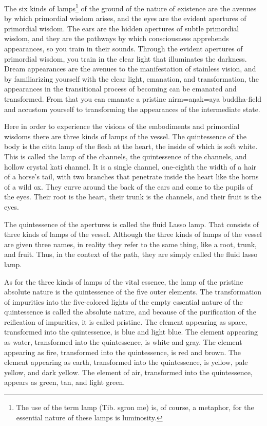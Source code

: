 \documentclass[11pt,twocolumn]{article}
\begin{document}
The six kinds of lamps\footnote{The use of the term lamp (Tib. sgron
  me) is, of course, a metaphor, for the essential nature of these
  lamps is luminosity.} of the ground of the nature of existence are
the avenues by which primordial wisdom arises, and the eyes are the
evident apertures of primordial wisdom. The ears are the hidden
apertures of subtle primordial wisdom, and they are the pathways by
which consciousness apprehends appearances, so you train in their
sounds. Through the evident apertures of primordial wisdom, you train
in the clear light that illuminates the darkness. Dream appearances
are the avenues to the manifestation of stainless vision, and by
familiarizing yourself with the clear light, emanation, and
transformation, the appearances in the transitional process of
becoming can be emanated and transformed. From that you can emanate a
pristine nirm\a={a}\d{n}ak\a={a}ya buddha\hyp{}field and accustom
yourself to transforming the appearances of the intermediate state.

Here in order to experience the visions of the embodiments and
primordial wisdoms there are three kinds of lamps of the vessel. The
quintessence of the body is the citta lamp of the flesh at the heart,
the inside of which is soft white. This is called the lamp of the
channels, the quintessence of the channels, and hollow crystal kati
channel. It is a single channel, one\hyp{}eighth the width of a hair
of a horse's tail, with two branches that penetrate inside the heart
like the horns of a wild ox. They curve around the back of the ears
and come to the pupils of the eyes. Their root is the heart, their
trunk is the channels, and their fruit is the eyes.

The quintessence of the apertures is called the fluid Lasso lamp. That
consists of three kinds of lamps of the vessel. Although the three
kinds of lamps of the vessel are given three names, in reality they
refer to the same thing, like a root, trunk, and fruit. Thus, in the
context of the path, they are simply called the fluid lasso lamp.

As for the three kinds of lamps of the vital essence, the lamp of the
pristine absolute nature is the quintessence of the five outer
elements. The transformation of impurities into the five\hyp{}colored
lights of the empty essential nature of the quintessence is called the
absolute nature, and because of the purification of the reification of
impurities, it is called pristine. The element appearing as space,
transformed into the quintessence, is blue and light blue. The element
appearing as water, transformed into the quintessence, is white and
gray. The element appearing as fire, transformed into the
quintessence, is red and brown. The element appearing as earth,
transformed into the quintessence, is yellow, pale yellow, and dark
yellow. The element of air, transformed into the quintessence, appears
as green, tan, and light green.
\end{document}
